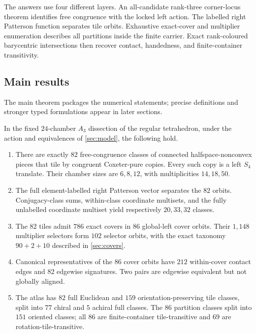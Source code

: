 The answers use four different layers.  An all-candidate rank-three
corner-locus theorem identifies free congruence with the locked left action.
The labelled right Patterson function separates tile orbits.  Exhaustive
exact-cover and multiplier enumeration describes all partitions inside the
finite carrier.  Exact rank-coloured barycentric intersections then recover
contact, handedness, and finite-container transitivity.

\subsection{Main results}

The main theorem packages the numerical statements; precise definitions and
stronger typed formulations appear in later sections.

\begin{theorem}
\label{thm:overview}
In the fixed $24$-chamber $A_3$ dissection of the regular tetrahedron, under
the action and equivalences of \cref{sec:model}, the following hold.
\begin{enumerate}[label=(\alph*),leftmargin=2.2em]
\item There are exactly $82$ free-congruence classes of connected
halfspace-nonconvex pieces that tile by congruent Coxeter-pure copies.  Every
such copy is a left $S_4$ translate.  Their chamber sizes are $6,8,12$, with
multiplicities $14,18,50$.
\item The full element-labelled right Patterson vector separates the $82$
orbits.  Conjugacy-class sums, within-class coordinate multisets, and the
fully unlabelled coordinate multiset yield respectively $20,33,32$ classes.
\item The $82$ tiles admit $786$ exact covers in $86$ global-left cover
orbits.  Their $1{,}148$ multiplier selectors form $102$ selector orbits,
with the exact taxonomy $90+2+10$ described in \cref{sec:covers}.
\item Canonical representatives of the $86$ cover orbits have $212$
within-cover contact edges and $82$ edgewise signatures.  Two pairs are
edgewise equivalent but not globally aligned.
\item The atlas has $82$ full Euclidean and $159$ orientation-preserving tile
classes, split into $77$ chiral and $5$ achiral full classes.  The $86$
partition classes split into $151$ oriented classes; all $86$ are
finite-container tile-transitive and $69$ are rotation-tile-transitive.
\end{enumerate}
\end{theorem}

